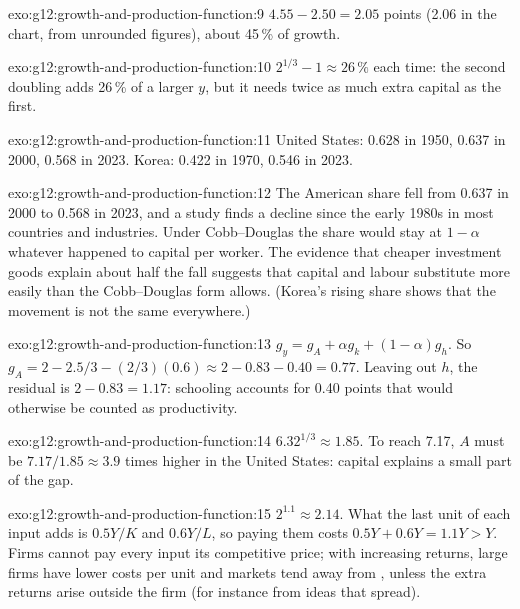 \begin{solution}{exo:g12:growth-and-production-function:9}
$4.55 - 2.50 = 2.05$ points (2.06 in the chart, from unrounded figures), about 45\,\% of growth.
\end{solution}

\begin{solution}{exo:g12:growth-and-production-function:10}
$2^{1/3} - 1 \approx 26\,\%$ each time: the second doubling adds 26\,\% of a larger $y$, but it needs twice as much extra capital as the first.
\end{solution}

\begin{solution}{exo:g12:growth-and-production-function:11}
United States: 0.628 in 1950, 0.637 in 2000, 0.568 in 2023. Korea: 0.422 in 1970, 0.546 in 2023.
\end{solution}

\begin{solution}{exo:g12:growth-and-production-function:12}
The American share fell from 0.637 in 2000 to 0.568 in 2023, and a study finds a decline since the early 1980s in most countries and industries. Under Cobb--Douglas the
share would stay at $1 - \alpha$ whatever happened to capital per worker. The evidence that cheaper investment goods explain about half the fall suggests that capital and
labour substitute more easily than the Cobb--Douglas form allows. (Korea's rising share shows that the movement is not the same everywhere.)
\end{solution}

\begin{solution}{exo:g12:growth-and-production-function:13}
$g_y = g_A + \alpha g_k + (1 - \alpha)g_h$. So $g_A = 2 - 2.5/3 - (2/3)(0.6) \approx 2 - 0.83 - 0.40 = 0.77$. Leaving out $h$, the residual is $2 - 0.83 = 1.17$: schooling
accounts for 0.40 points that would otherwise be counted as productivity.
\end{solution}

\begin{solution}{exo:g12:growth-and-production-function:14}
$6.32^{1/3} \approx 1.85$. To reach 7.17, $A$ must be $7.17/1.85 \approx 3.9$ times higher in the United States: capital explains a small part of the gap.
\end{solution}

\begin{solution}{exo:g12:growth-and-production-function:15}
$2^{1.1} \approx 2.14$. What the last unit of each input adds is $0.5Y/K$ and $0.6Y/L$, so paying them costs $0.5Y + 0.6Y = 1.1Y > Y$. Firms cannot pay every input its
competitive price; with increasing returns, large firms have lower costs per unit and markets tend away from , unless the extra returns arise outside
the firm (for instance from ideas that spread).
\end{solution}

